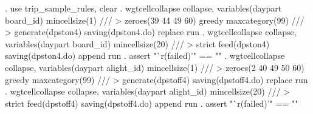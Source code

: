 {\medskip}
. use trip_sample_rules, clear
{\smallskip}
. wgtcellcollapse collapse, variables(daypart board_id) mincellsize(1) ///
>         zeroes(39 44 49 60) greedy maxcategory(99) ///
>         generate(dpston4) saving(dpston4.do) replace run
\smallskip
\oom
\smallskip
. wgtcellcollapse collapse, variables(daypart board_id) mincellsize(20) ///
>         strict feed(dpston4) saving(dpston4.do) append run
\smallskip
\oom
\smallskip
. assert "`r(failed)'" == ""
{\smallskip}
. wgtcellcollapse collapse, variables(daypart alight_id) mincellsize(1) ///
>         zeroes(2 40 49 50 60) greedy maxcategory(99) ///
>         generate(dpstoff4) saving(dpstoff4.do) replace run
\smallskip
\oom
\smallskip
. wgtcellcollapse collapse, variables(daypart alight_id) mincellsize(20) ///
>         strict feed(dpstoff4) saving(dpstoff4.do) append run
\smallskip
\oom
\smallskip
. assert "`r(failed)'" == ""
{\smallskip}
